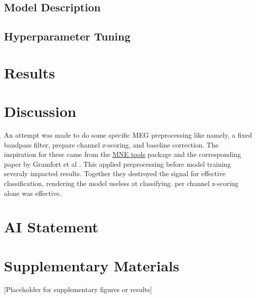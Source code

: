 \documentclass[conference]{IEEEtran}
\begin{document}
\subsection{Model Description}


\subsection{Hyperparameter Tuning}

\section{Results}

\section{Discussion}
An attempt was made to do some specific MEG preprocessing like namely, a fixed bandpass filter, prepare
channel z-scoring, and baseline correction. The inspiration for these came from the 
\href{https://mne.tools/stable/index.html}{MNE tools} package and the corresponding paper by Gramfort et al 
\cite{gramfort2013meg}. This applied preprocessing before model training severaly impacted results.
Together they destroyed the signal for effective classification, rendering the model useless at 
classifying. per channel z-scoring alone was effective.

\section*{AI Statement}




\section*{Supplementary Materials}
[Placeholder for supplementary figures or results]

\clearpage
\onecolumn
\end{document}
